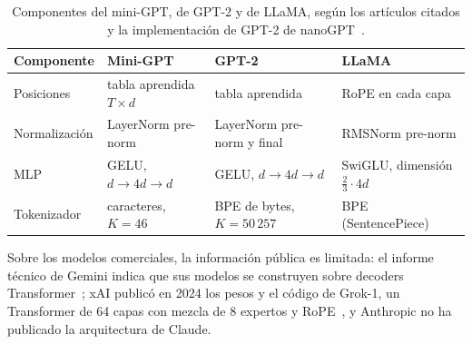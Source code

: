 \begin{table}[h]
\centering\small
\caption{Componentes del mini-GPT, de GPT-2 y de LLaMA, según los artículos citados y la implementación de GPT-2 de nanoGPT~\cite{nanogpt}.}\label{tab:arquitecturas}
\begin{tabularx}{\textwidth}{@{}l>{\raggedright\arraybackslash}X>{\raggedright\arraybackslash}X>{\raggedright\arraybackslash}X@{}}
\toprule
Componente & Mini-GPT & GPT-2~\cite{gpt2} & LLaMA~\cite{llama} \\
\midrule
Posiciones & tabla aprendida $T\times d$ & tabla aprendida & RoPE en cada capa \\
Normalización & LayerNorm pre-norm & LayerNorm pre-norm y final & RMSNorm pre-norm \\
MLP & GELU, $d\to 4d\to d$ & GELU, $d\to 4d\to d$ & SwiGLU, dimensión $\tfrac23\cdot 4d$ \\
Tokenizador & caracteres, $K=46$ & BPE de bytes, $K=50\,257$ & BPE (SentencePiece) \\
\bottomrule
\end{tabularx}
\end{table}

Sobre los modelos comerciales, la información pública es limitada: el informe técnico de Gemini indica que sus modelos se construyen sobre decoders Transformer~\cite[§2]{gemini}; xAI publicó en 2024 los pesos y el código de Grok-1, un Transformer de 64 capas con mezcla de 8 expertos y RoPE~\cite{grok1}, y Anthropic no ha publicado la arquitectura de Claude.

